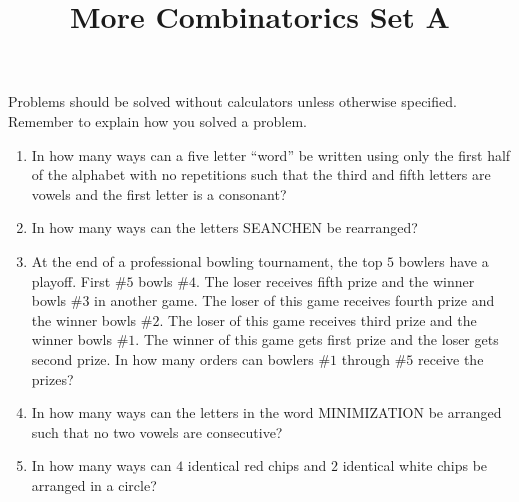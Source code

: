 \documentclass{article}
\title{More Combinatorics Set A}
\date{}
\author{}
\begin{document}
\maketitle
\noindent Problems should be solved without calculators unless otherwise 
specified. Remember to explain how you solved a problem.
\begin{enumerate}
    \item In how many ways can a five letter ``word'' be written using only 
        the first half of the alphabet with no repetitions such that the 
        third and fifth letters are vowels and the first letter is a 
        consonant?
        \vspace{3cm}
    \item In how many ways can the letters SEANCHEN be rearranged?
        \vspace{3cm}
    \item At the end of a professional bowling tournament, the top $5$ bowlers 
        have a playoff. First \#$5$ bowls \#$4$. The loser receives fifth prize 
        and the winner bowls \#$3$ in another game. The loser of this game 
        receives fourth prize and the winner bowls \#$2$. The loser of this game 
        receives third prize and the winner bowls \#$1$. The winner of this game 
        gets first prize and the loser gets second prize. In how many orders can 
        bowlers \#$1$ through \#$5$ receive the prizes?
        \vspace{3cm}
    \item In how many ways can the letters in the word MINIMIZATION be arranged 
        such that no two vowels are consecutive?
        \vspace{3cm}
    \item In how many ways can $4$ identical red chips and $2$ identical white chips be 
        arranged in a circle?
        \vspace{3cm}
\end{enumerate}
\end{document}
